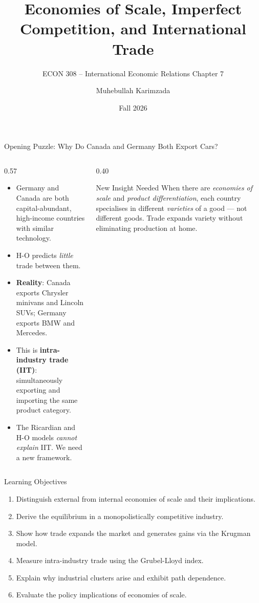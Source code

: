 \documentclass[aspectratio=169]{beamer}
\title{\textbf{Economies of Scale, Imperfect Competition, and International Trade}}
\subtitle{{\large ECON 308 -- International Economic Relations \quad Chapter 7}}
\author{Muhebullah Karimzada}
\institute{School of Economics \\ University of Northern British Columbia}
\date{Fall 2026}
\begin{document}
\begin{frame}[plain]\titlepage\end{frame}

\begin{frame}{Opening Puzzle: Why Do Canada and Germany Both Export Cars?}
\begin{columns}
\begin{column}{0.57\textwidth}
\begin{itemize}
  \item Germany and Canada are both capital-abundant, high-income countries with similar technology.
  \item H-O predicts \emph{little} trade between them.
  \item \textbf{Reality}: Canada exports Chrysler minivans and Lincoln SUVs; Germany exports BMW and Mercedes.
  \item This is \textbf{intra-industry trade (IIT)}: simultaneously exporting and importing the same product category.
  \item The Ricardian and H-O models \emph{cannot explain} IIT. We need a new framework.
\end{itemize}
\end{column}
\begin{column}{0.40\textwidth}
\begin{insight}{New Insight Needed}
  When there are \emph{economies of scale} and \emph{product differentiation}, each country specialises in different \emph{varieties} of a good --- not different goods. Trade expands variety without eliminating production at home.
\end{insight}
\end{column}
\end{columns}
\end{frame}

\begin{frame}{Learning Objectives}
\begin{enumerate}
  \item Distinguish external from internal economies of scale and their implications.
  \item Derive the equilibrium in a monopolistically competitive industry.
  \item Show how trade expands the market and generates gains via the Krugman model.
  \item Measure intra-industry trade using the Grubel-Lloyd index.
  \item Explain why industrial clusters arise and exhibit path dependence.
  \item Evaluate the policy implications of economies of scale.
\end{enumerate}
\end{frame}
\end{document}
